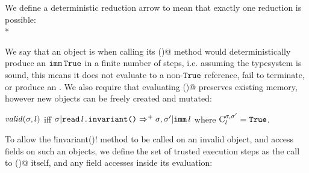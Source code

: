 %
%
We define a deterministic reduction arrow to mean that exactly one reduction is possible:\\*

\noindent We say that an object is \valid when calling its \Q@invariant()@ method would
deterministically produce an $\Kw{imm}\,\Kw{True}$ in a finite number of steps, i.e. assuming the typesystem is sound, this means it does not evaluate to a non-$\Kw{True}$ reference, fail to terminate, or produce an \error.
We also require that evaluating \Q@invariant()@ preserves existing memory, however new objects can be freely created and mutated:

\indent$\valid(\s,l)$ iff $\s | \invariant{l} \Rightarrow^+ \s,\s' | \Kw{imm}\,l$ where  $\C[\s,\s']{l} = \Kw{True}$.%

\noindent
To allow the \Q!invariant()! method to be called on an invalid object, and access fields on such an objects, we define the set of trusted execution steps as the call to \Q@invariant()@ itself, and any field accesses inside its evaluation:

